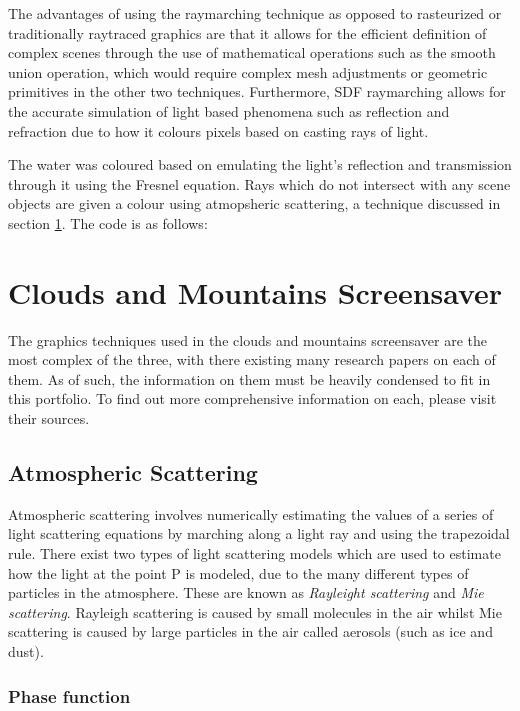 \documentclass[10pt, openany]{book}
\begin{document}
The advantages of using the raymarching technique as opposed to rasteurized or traditionally raytraced graphics are that it allows for the efficient definition of complex scenes through the use of mathematical operations such as the smooth union operation, which would require complex mesh adjustments or geometric primitives in the other two techniques. Furthermore, SDF raymarching allows for the accurate simulation of light based phenomena such as reflection and refraction due to how it colours pixels based on casting rays of light. 

The water was coloured based on emulating the light's reflection and transmission through it using the Fresnel equation. Rays which do not intersect with any scene objects are given a colour using atmopsheric scattering, a technique discussed in section \ref{sec:clouds}. The code is as follows: 

\section{Clouds and Mountains Screensaver}
\label{sec:clouds}

The graphics techniques used in the clouds and mountains screensaver are the most complex of the three, with there existing many research papers on each of them. As of such, the information on them must be heavily condensed to fit in this portfolio. To find out more comprehensive information on each, please visit their sources. 

\subsection{Atmospheric Scattering}

Atmospheric scattering involves numerically estimating the values of a series of light scattering equations by marching along a light ray and using the trapezoidal rule. There exist two types of light scattering models which are used to estimate how the light at the point P is modeled, due to the many different types of particles in the atmosphere. These are known as \textit{Rayleight scattering} and \textit{Mie scattering}. Rayleigh scattering is caused by small molecules in the air whilst Mie scattering is caused by large particles in the air called aerosols (such as ice and dust). \citep{gpugems2}

\subsubsection{Phase function}
\end{document}
